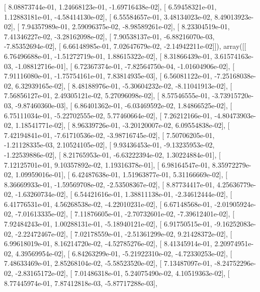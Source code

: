 \documentclass{article}
\begin{document}
       [  8.08873744e-01,   1.24668123e-01,  -1.69716438e-02],
       [  6.59458321e-01,   1.12883181e-01,  -4.58414130e-02],
       [  6.55584657e-01,   3.48134023e-02,   8.49013923e-02],
       [  7.94357989e-01,   2.59096375e-02,  -8.98589261e-02],
       [  8.23304519e-01,   7.41346227e-02,  -3.28162098e-02],
       [  7.90538137e-01,  -6.88216070e-03,  -7.85352694e-02],
       [  6.66148985e-01,   7.02647679e-02,  -2.14942211e-02]]), array([[  6.76496688e-01,  -1.51272719e-01,   1.88615322e-02],
       [  8.31866439e-01,   3.61574163e-03,  -1.08812716e-01],
       [  6.72367374e-01,  -7.82564750e-04,  -1.01604906e-02],
       [  7.91116080e-01,  -1.75754161e-01,   7.83814935e-03],
       [  6.56081122e-01,  -7.25168038e-02,   6.32939165e-02],
       [  8.48188976e-01,  -5.30604232e-02,  -8.11041913e-02],
       [  7.56856127e-01,   2.49305121e-02,   5.27096098e-02],
       [  8.57546555e-01,  -3.73915720e-03,  -9.87460360e-03],
       [  6.86401362e-01,  -6.03469592e-02,   1.84866525e-02],
       [  6.75111034e-01,  -5.22702555e-02,   5.77460664e-02],
       [  7.26212166e-01,  -4.80473903e-02,   1.18541771e-02],
       [  8.96339726e-01,  -3.20120007e-02,   6.09554838e-02],
       [  7.42194841e-01,  -7.61710536e-02,  -3.98716745e-02],
       [  7.50706205e-01,  -1.21128335e-03,   2.10524105e-02],
       [  9.93436453e-01,  -9.13235953e-02,  -1.22539886e-02],
       [  8.21765953e-01,  -6.63222394e-02,   1.30224884e-01],
       [  7.12125701e-01,   9.10357892e-02,   1.19316378e-01],
       [  6.98164547e-01,   8.35972279e-02,   1.09959016e-01],
       [  6.42487638e-01,   1.51963877e-01,   5.31166669e-02],
       [  8.36669933e-01,  -1.59569708e-02,  -2.53508367e-02],
       [  8.87734417e-01,   4.25636779e-02,  -1.63260734e-02],
       [  6.54421616e-01,   1.38811138e-01,  -2.34612444e-02],
       [  6.41776531e-01,   4.56268538e-02,  -4.22010231e-02],
       [  6.67148568e-01,  -2.01905924e-02,  -7.01613335e-02],
       [  7.11876605e-01,  -2.70732601e-02,  -7.39612401e-02],
       [  7.92484243e-01,   1.00288131e-01,  -5.18940121e-02],
       [  6.91750515e-01,  -9.16252083e-02,  -2.22472467e-02],
       [  7.02178559e-01,  -2.51361299e-02,   9.21428372e-02],
       [  6.99618019e-01,   8.16214720e-02,  -4.52785276e-02],
       [  8.41345914e-01,   2.20974951e-02,   4.39569954e-02],
       [  6.84263299e-01,  -5.21922310e-02,  -4.72330253e-02],
       [  7.48633469e-01,   2.85268104e-02,  -5.58523520e-02],
       [  7.13487097e-01,  -8.24752296e-02,  -2.83165172e-02],
       [  7.01486318e-01,   5.24075490e-02,   4.10519363e-02],
       [  8.77445974e-01,   7.87412818e-03,  -5.87717288e-03],
\end{document}
